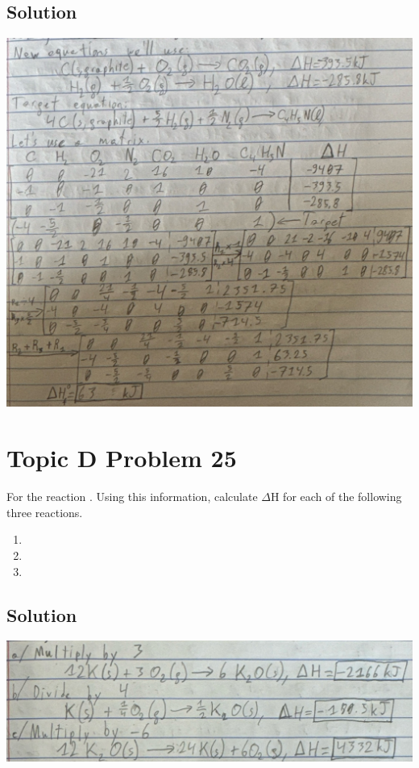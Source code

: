 \documentclass[10pt]{article}
\begin{document}
        \subsection{Solution}
            \begin{center}
                \includegraphics[width=\textwidth]{Answers Images/D24.jpg}
            \end{center}



    \pagebreak
    \section{Topic D Problem 25}
        For the reaction . 
        Using this information, calculate $\Delta$H for each of the following three reactions.
        \begin{enumerate}[label=\alph*)]
            \item   {}
            \item   {}
            \item   {}
        \end{enumerate}

        \subsection{Solution}
            \begin{center}
                \includegraphics[width=\textwidth]{Answers Images/D25.jpg}
            \end{center}
\end{document}
